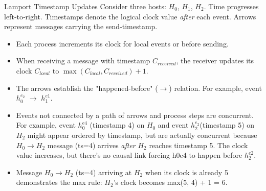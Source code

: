 \begin{example}{Lamport Timestamp Updates}
Consider three hosts: $H_0$, $H_1$, $H_2$. Time progresses left‑to‑right.
Timestamps denote the logical clock value \emph{after} each event.
Arrows represent messages carrying the send‑timestamp.

\begin{itemize}[noitemsep]
    \item Each process increments its clock for local events or before sending.
    \item When receiving a message with timestamp \( C_{received} \), the receiver updates its clock \( C_{local} \) to \( \max(C_{local}, C_{received}) + 1 \).
    \item The arrows establish the "happened-before" (\( \rightarrow \)) relation. For example, event $h_0^{e_2}$ \( \rightarrow \) $h_1^{e1}$.
    \item Events not connected by a path of arrows and process steps are concurrent. For example, event $h_0^{e4}$ (timestamp 4) on $H_0$ and event $h_{2}^{e_2}$(timestamp 5) on $H_2$ might appear ordered by timestamp, but are actually concurrent because $H_0 \rightarrow H_2$ message (ts=4) arrives \textit{after} $H_2$ reaches timestamp 5. The clock value increases, but there's no causal link forcing h0e4 to happen before $h_2^{e2}$.
    \item Message $H_0 \rightarrow H_2$ (ts=4) arriving at $H_2$ when its clock is already 5 demonstrates the max rule: $H_2$'s clock becomes max(5, 4) + 1 = 6.
\end{itemize}
\vspace{0.5em}

\begin{center}
\end{center}
\end{example}
